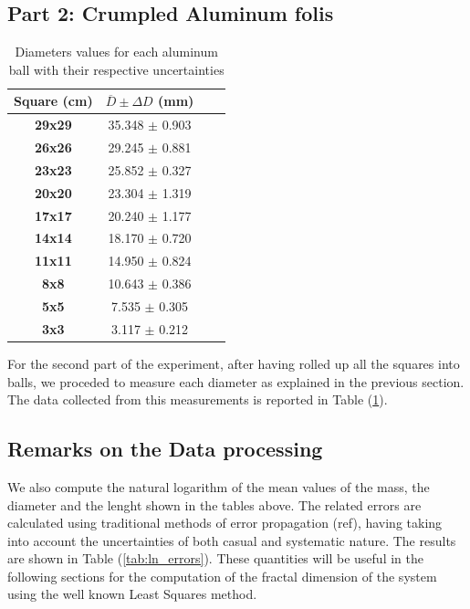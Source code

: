 \documentclass[a4paper,12pt]{article}
\begin{document}
\subsection{Part 2: Crumpled Aluminum folis}
\begin{table}[h!] 
    \centering
    \begin{tabular}{|c|c|c|c|}
    \hline
        \textbf{Square (cm)} & \( \overline{D} \pm \Delta D \) (mm) \\ \hline 
        \textbf{29x29} & 35.348 \(\pm\) 0.903              \\ \hline
        \textbf{26x26} & 29.245 \(\pm\) 0.881              \\ \hline
        \textbf{23x23} & 25.852 \(\pm\) 0.327              \\ \hline
        \textbf{20x20} & 23.304 \(\pm\) 1.319              \\ \hline
        \textbf{17x17} & 20.240 \(\pm\) 1.177              \\ \hline
        \textbf{14x14} & 18.170 \(\pm\) 0.720              \\ \hline
        \textbf{11x11} & 14.950 \(\pm\) 0.824              \\ \hline
        \textbf{8x8}   & 10.643 \(\pm\) 0.386              \\ \hline
        \textbf{5x5}   & 7.535  \(\pm\) 0.305              \\ \hline
        \textbf{3x3}   & 3.117 \(\pm\) 0.212               \\ \hline
    \end{tabular}
    \caption{Diameters values for each aluminum ball with their respective uncertainties}
    \label{tab:balls}
\end{table}

For the second part of the experiment, after having rolled up all the squares into balls, we proceded to measure each diameter as explained in the previous section. The data collected from this measurements is reported in Table (\ref{tab:balls}).




\subsection{Remarks on the Data processing} 
We also compute the natural logarithm of the mean values of the mass, the diameter and the lenght shown in the tables above. The related errors are calculated using traditional methods of error propagation (ref), having taking into account the uncertainties of both casual and systematic nature. The results are shown in Table (\ref{tab:ln_errors}). These quantities will be useful in the following sections for the computation of the fractal dimension of the system using the well known Least Squares method.
\end{document}
